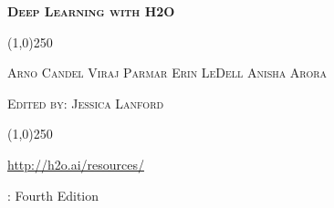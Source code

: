 



%
\usepackage{bibentry}





\thispagestyle{empty} %


\begin{center}
\textsc{\Large\bf{Deep Learning with H2O}}
\bigskip

\line(1,0){250}  %



\bigskip

\textsc{\small{Arno Candel \hspace{10pt} Viraj Parmar \hspace{10pt} Erin LeDell  \hspace{10pt} Anisha Arora}}

\textsc{\small{Edited by: Jessica Lanford}}

\line(1,0){250}  %

{\url{http://h2o.ai/resources/}}

\normalsize
\bigskip
\monthname \hspace{1pt}  \the\year: Fourth Edition 

\bigskip
\end{center}

